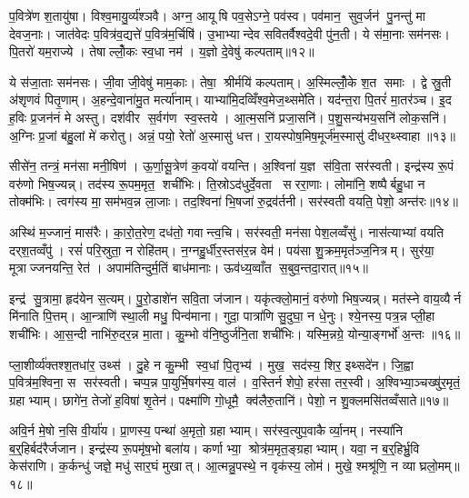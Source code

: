 प॒वित्रे॑ण श॒तायु॑षा। विश्व॒मायु॒र्व्य॑श्ञवै। अग्न॒ आयूषि पव॒सेऽग्ने॒ पव॑स्व। पव॑मान॒ सुव॒र्जन॑ पु॒नन्तु॑ मा देवज॒नाः। जात॑वेदः प॒वित्र॑व॒द्यत्ते॑ प॒वित्र॑म॒र्चिषि॑। उ॒भाभ्यान्देव सवितर्वैश्वदे॒वी पु॑न॒ती। ये स॑मा॒नाः सम॑नसः। पि॒तरो॑ यम॒राज्ये। तेषाल्लोँ॒कः स्व॒धा नम॑। य॒ज्ञो दे॒वेषु॑ कल्पताम्॥१२॥

ये स॑जा॒ताः सम॑नसः। जी॒वा जी॒वेषु॑ माम॒काः। तेषा॒ श्रीर्मयि॑ कल्पताम्। अ॒स्मिल्लोँ॒के श॒त समाः। द्वे स्रु॒ती अ॑शृणवं पितृ॒णाम्। अ॒हन्दे॒वाना॑मु॒त मर्त्या॑नाम्। याभ्या॑मि॒दव्विँश्व॒मेज॒थ्समे॑ति। यद॑न्त॒रा पि॒तरं॑ मा॒तर॑ञ्च। इ॒द ह॒विः प्र॒जन॑नं मे अस्तु। दश॑वीर स॒र्वग॑ण स्व॒स्तये। आ॒त्म॒सनि॑ प्रजा॒सनि॑। प॒शु॒सन्य॑भय॒सनि॑ लोक॒सनि॑। अ॒ग्निः प्र॒जां ब॑हु॒लां मे॑ करोतु। अन्नं॒ पयो॒ रेतो॑ अ॒स्मासु॑ धत्त। रा॒यस्पोष॒मिष॒मूर्ज॑म॒स्मासु॑ दीधर॒थ्स्वाहा॥१३॥\anuvakamend[इ॒न्द्रि॒याय॑ पि॒तर॑श्श॒तायु॑षा पु॒नन्तु॑ मा पिताम॒हाः पु॒नन्तु॒ प्रपि॑तामहाः कल्पता स्व॒स्तये॒ पञ्च॑ च]

सीसे॑न॒ तन्त्रं॒ मन॑सा मनी॒षिण॑। ऊ॒र्णा॒सू॒त्रेण॑ क॒वयो॑ वयन्ति। अ॒श्विना॑ य॒ज्ञ स॑वि॒ता सर॑स्वती। इन्द्र॑स्य रू॒पं वरु॑णो भिष॒ज्यन्न्। तद॑स्य रू॒पम॒मृत॒ शची॑भिः। ति॒स्रोऽद॑धुर्दे॒वता सररा॒णाः। लोमा॑नि॒ शष्पैर्बहु॒धा न तोक्म॑भिः। त्वग॑स्य मा॒सम॑भव॒न्न ला॒जाः। तद॒श्विना॑ भि॒षजा॑ रु॒द्रव॑र्तनी। सर॑स्वती वयति॒ पेशो॒ अन्त॑रः॥१४॥

अस्थि॑ म॒ज्जानं॒ मास॑रैः। का॒रो॒त॒रेण॒ दध॑तो॒ गवान्त्व॒चि। सर॑स्वती॒ मन॑सा पेश॒लव्वँसु॑। नास॑त्याभ्यां वयति दर्‌श॒तव्वँपु॑। रसं॑ परि॒स्रुता॒ न रोहि॑तम्। न॒ग्नहु॒र्धीर॒स्तस॑र॒न्न वेम॑। पय॑सा शु॒क्रम॒मृत॑ञ्ज॒नित्रम्। सुर॑या॒ मूत्राज्जनयन्ति॒ रेत॑। अपाम॑तिन्दुर्म॒तिं बाध॑मानाः। ऊव॑ध्य॒व्वाँत स॒बुव॒न्तदा॒रात्॥१५॥

इन्द्र॑ सु॒त्रामा॒ हृद॑येन स॒त्यम्। पु॒रो॒डाशे॑न सवि॒ता ज॑जान। यकृ॑त्क्लो॒मानं॒ वरु॑णो भिष॒ज्यन्न्। मत॑स्ने वाय॒व्यैर्न मि॑नाति पि॒त्तम्। आ॒न्त्राणि॑ स्था॒ली मधु॒ पिन्व॑माना। गुदा॒ पात्रा॑णि सु॒दुघा॒ न धे॒नुः। श्ये॒नस्य॒ पत्र॒न्न प्ली॒हा शची॑भिः। आ॒स॒न्दी नाभि॑रु॒दर॒न्न मा॒ता। कु॒म्भो व॑नि॒ष्ठुर्ज॑नि॒ता शची॑भिः। यस्मि॒न्नग्रे॒ योन्या॒ङ्गर्भो॑ अ॒न्तः ॥१६॥

प्ला॒शीर्व्य॑क्तश्श॒तधा॑र॒ उथ्स॑। दु॒हे न कु॒म्भी स्व॒धां पि॒तृभ्य॑। मुख॒ सद॑स्य॒ शिर॒ इथ्सदे॑न। जि॒ह्वा प॒वित्र॑म॒श्विना॒ स सर॑स्वती। चप्प॒न्न पा॒युर्भि॒षग॑स्य॒ वाल॑। व॒स्तिर्न शेपो॒ हर॑सा तर॒स्वी। अ॒श्विभ्या॒ञ्चख्षु॑र॒मृतं॒ ग्रहाभ्याम्। छागे॑न॒ तेजो॑ ह॒विषा॑ शृ॒तेन॑। पक्ष्मा॑णि गो॒धूमै॒ क्व॑लैरु॒तानि॑। पेशो॒ न शु॒क्लमसि॑तव्वँसाते॥१७॥

अवि॒र्न मे॒षो न॒सि वी॒र्या॑य। प्रा॒णस्य॒ पन्था॑ अ॒मृतो॒ ग्रहाभ्याम्। सर॑स्व॒त्युप॒वाकैर्व्या॒नम्। नस्या॑नि ब॒र्॒हिर्बद॑रैर्जजान। इन्द्र॑स्य रू॒पमृ॑ष॒भो बला॑य। कर्णाभ्या॒ श्रोत्र॑म॒मृत॒ङ्ग्रहाभ्याम्। यवा॒ न ब॒र्॒हिर्भ्रु॒वि केस॑राणि। क॒र्कन्धु॑ जज्ञे॒ मधु॑ सार॒घं मुखात्। आ॒त्मन्नु॒पस्थे॒ न वृक॑स्य॒ लोम॑। मुखे॒ श्मश्रू॑णि॒ न व्याघ्रलो॒मम्॥१८॥

